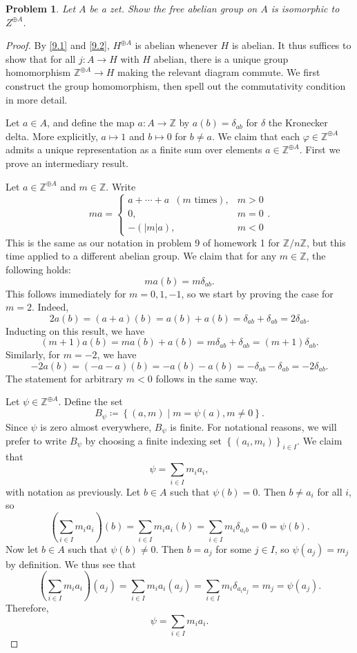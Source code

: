 \documentclass[11pt, letterpaper]{article}
\theoremstyle{plain}
\newtheorem{problem}{Problem}[section]
\begin{document}
\begin{problem}\label{9.3}
	Let $A$ be a zet. Show the free abelian group on $A$ is isomorphic to $Z^{\oplus A} $.
\end{problem}
\begin{proof}
By \cref{9.1} and \cref{9.2}, $H^{\oplus A} $ is abelian whenever $H$ is abelian. It thus suffices to show that for all $j : A \to H$ with $H$ abelian, there is a unique group homomorphism $\mathbb{Z} ^{\oplus A} \to H$ making the relevant diagram commute. We first construct the group homomorphism, then spell out the commutativity condition in more detail.

	Let $a\in A$, and define the map $a : A \to \mathbb{Z} $ by $a(b)=\delta _{ab} $ for $\delta $ the Kronecker delta. More explicitly, $a\mapsto 1$ and $b\mapsto 0$ for $b\neq a$. We claim that each $\varphi \in \mathbb{Z} ^{\oplus A} $ admits a unique representation as a finite sum over elements $a\in\mathbb{Z} ^{\oplus A} $. First we prove an intermediary result.

	Let $a\in\mathbb{Z} ^{\oplus A} $ and $m\in\mathbb{Z} $. Write
	\[
		ma =
		\begin{cases}
			a + \cdots + a \,\,\,(m\text{ times}),&m>0\\
			0,&m=0\\
			-(|m|a),&m<0
		\end{cases}
	.\]
	This is the same as our notation in problem 9 of homework 1 for $\mathbb{Z} /n\mathbb{Z} $, but this time applied to a different abelian group. We claim that for any $m\in\mathbb{Z} $, the following holds:
	\[
		ma(b) = m\delta _{ab} 
	.\]
	This follows immediately for $m=0,1,-1$, so we start by proving the case for $m=2$. Indeed,
	\[
		2a(b)=(a+a)(b)=a(b)+a(b)=\delta _{ab} +\delta _{ab} =2\delta _{ab} 
	.\]
	Inducting on this result, we have
	\[
		(m+1)a(b)=ma(b)+a(b)=m\delta _{ab} +\delta _{ab} =(m+1)\delta _{ab} 
	.\]
	Similarly, for $m=-2$, we have
	\[
		-2a(b)=(-a-a)(b)=-a(b)-a(b)=-\delta _{ab} -\delta _{ab} =-2\delta _{ab} 
	.\]
	The statement for arbitrary $m<0$ follows in the same way.

	Let $\psi \in \mathbb{Z} ^{\oplus A} $. Define the set
	\[
		B_\psi \coloneqq \left\{ (a,m)\mid m=\psi (a),m\neq 0 \right\} 
	.\]
	Since $\psi $ is zero almost everywhere, $B_\psi $ is finite. For notational reasons, we will prefer to write $B_\psi $ by choosing a finite indexing set $\left\{ (a_i,m_i) \right\}_{i\in I} $. We claim that
	\[
		\psi = \sum_{i\in I} m_i a_i,
	\]
	with notation as previously. Let $b\in A$ such that $\psi (b)=0$. Then $b\neq a_i$ for all $i$, so
	\[
		\left( \sum_{i\in I} m_i a_i \right) (b)=\sum_{i\in I} m_ia_i(b)=\sum_{i\in I} m_i\delta_{a_ib} =0=\psi (b)
	.\]
	Now let $b\in A$ such that $\psi (b)\neq 0$. Then $b=a_j$ for some $j\in I$, so $\psi (a_j)=m_j$ by definition. We thus see that
	\[
		\left( \sum_{i\in I} m_ia_i \right) (a_j)=\sum_{i\in I} m_ia_i(a_j)=\sum_{i\in I} m_i \delta _{a_ia_j} =m_j=\psi (a_j)
	.\]
	Therefore,
	\[
		\psi =\sum_{i\in I} m_i a_i
	.\]
	

\end{proof}
\end{document}
